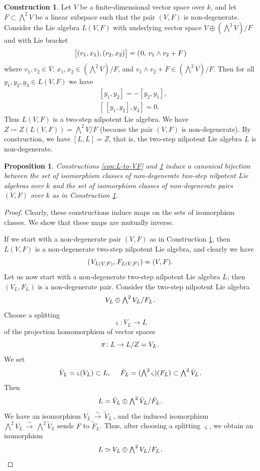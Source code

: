 \documentclass[11pt]{amsart}
\theoremstyle{plain}
\newtheorem{proposition}[theorem]{Proposition}
\theoremstyle{definition}
\newtheorem{construction}[theorem]{Construction}
\newcommand{\hs}{\kern 0.8pt}
\newcommand{\isoto}{{\,\overset\sim\longrightarrow\,}}
\newcommand{\z}{{Z}}
\renewcommand{\Lambda}{\textstyle\bigwedge}
\begin{document}
\begin{construction}\label{con:VF-to-L}
Let $V$ be a finite-dimensional vector space over $k$,
and let $F\subset \Lambda^2 V$ be a  linear subspace
such that the pair $(V,F)$ is non-degenerate.
Consider the Lie algebra $L(V,F)$  with underlying vector space
$V\oplus (\Lambda^2 V)/F$ and with Lie bracket
\[ \big[ (v_1,x_1), (v_2,x_2)\big]=(\hs 0,\, v_1\wedge v_2+F\hs)\]
where $v_1,v_2\in V$,  $x_1,x_2\in (\Lambda^2 V)/F$, and  $v_1\wedge v_2+F\in (\Lambda^2 V)/F$.
Then for all $y_1,y_2,y_3\in L(V,F)$ we have
\begin{align}
& [y_1,y_2]=-[y_2,y_1],  \\
& [\,[y_1,y_2],y_3]=0.
\end{align}
Thus $L(V,F)$ is a two-step nilpotent Lie algebra.
We have  $Z\coloneqq \z(L(V,F))=\Lambda^2 V/F$ (because the pair $(V,F)$ is non-degenerate).
By construction, we have $[L,L]=Z$, that is, the two-step nilpotent Lie algebra $L$ is non-degenerate.
\end{construction}


\begin{proposition}
Constructions \ref{con:L-to-VF} and \ref{con:VF-to-L} induce a canonical bijection
between the set of isomorphism classes of
non-degenerate two-step nilpotent Lie algebras over $k$
and the set of isomorphism classes of non-degenerate
pairs $(V,F)$ over $k$ as in Construction \ref{con:VF-to-L}.
\end{proposition}


\begin{proof}
Clearly, these constructions induce maps on the sets of isomorphism classes.
We show that these maps are mutually inverse.

If we start with a non-degenerate pair $(V,F)$ as in Construction \ref{con:VF-to-L}, then
$L(V,F)$ is a non-degenerate two-step nilpotent Lie algebra, and clearly we have
\begin{equation}\label{e:V(L(V,F))}
(\hs V_{L(V,F)},\hs F_{L(V,F)}\hs)=(V,F).
\end{equation}
Let us now start with a non-degenerate two-step nilpotent Lie algebra $L$;
then $(V_L,F_L)$ is a non-degenerate pair.
Consider the  two-step nilpotent Lie algebra
\[ V_L\oplus \Lambda^2 V_L/F_L\hs.\]
Choose a splitting
\[\varsigma\colon V_L\to L\]
of the projection homomorphism of vector spaces
\[\pi \colon L\to L/Z=V_L\hs.\]
We set
\[\tilde V_L=\varsigma(V_L)\subset L,\quad\  \tilde F_L=(\Lambda^2\varsigma)(F_L)\subset \Lambda^2\tilde V_L\hs.\]
Then
\[ L= \tilde V_L\oplus \Lambda^2\tilde V_L/\tilde F_L\hs.\]
We have an isomorphism $V_L\isoto \tilde V_L$\,,
and the induced isomorphism $\Lambda^2 V_L\isoto \Lambda^2 \tilde V_L$
sends $F$ to $\tilde F_L$.
Thus, after choosing a splitting $\varsigma$, we obtain an isomorphism
\[ L\simeq V_L\oplus \Lambda^2 V_L/F_L\hs.\qedhere\]
\end{proof}
\end{document}

